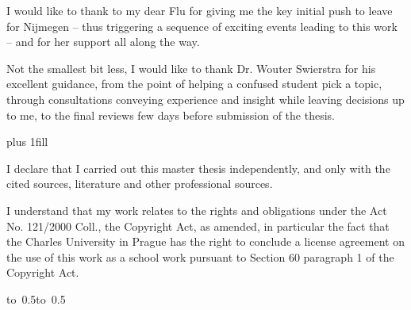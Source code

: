 \newpage



\openright

\noindent
I would like to thank to my dear Flu for giving me the key initial push to leave for
Nijmegen -- thus triggering a sequence of exciting events leading to this work --
and for her support all along the way.

Not the smallest bit less, I would like to thank Dr. Wouter Swierstra for his excellent
guidance, from the point of helping a confused student pick a topic, through consultations
conveying experience and insight while leaving decisions up to me, to the final reviews few days
before submission of the thesis.
\newpage


\vglue 0pt plus 1fill

\noindent
I declare that I carried out this master thesis independently, and only with the cited
sources, literature and other professional sources.

\medskip\noindent
I understand that my work relates to the rights and obligations under the Act No.
121/2000 Coll., the Copyright Act, as amended, in particular the fact that the Charles
University in Prague has the right to conclude a license agreement on the use of this
work as a school work pursuant to Section 60 paragraph 1 of the Copyright Act.

\vspace{10mm}

\hbox{\hbox to 0.5\hbox to 0.5}

\vspace{20mm}
\newpage



